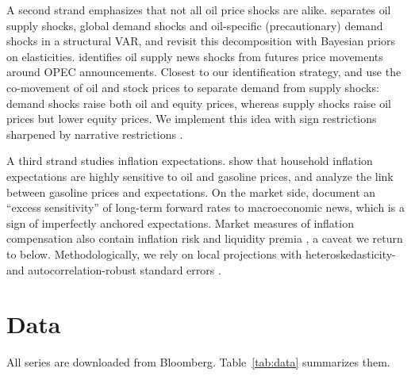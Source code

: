 \documentclass[11pt,a4paper]{article}
\begin{document}
A second strand emphasizes that not all oil price shocks are alike. \citet{kilian2009} separates oil supply shocks, global demand shocks and oil-specific (precautionary) demand shocks in a structural VAR, and \citet{baumeister2019} revisit this decomposition with Bayesian priors on elasticities. \citet{kanzig2021} identifies oil supply news shocks from futures price movements around OPEC announcements. Closest to our identification strategy, \citet{kilianpark2009} and \citet{ready2018} use the co-movement of oil and stock prices to separate demand from supply shocks: demand shocks raise both oil and equity prices, whereas supply shocks raise oil prices but lower equity prices. We implement this idea with sign restrictions \citep{uhlig2005} sharpened by narrative restrictions \citep{antolin2018}.

A third strand studies inflation expectations. \citet{coibion2015} show that household inflation expectations are highly sensitive to oil and gasoline prices, and \citet{kilianzhou2022} analyze the link between gasoline prices and expectations. On the market side, \citet{gurkaynak2005} document an ``excess sensitivity'' of long-term forward rates to macroeconomic news, which is a sign of imperfectly anchored expectations. Market measures of inflation compensation also contain inflation risk and liquidity premia \citep{damico2018}, a caveat we return to below. Methodologically, we rely on local projections \citep{jorda2005} with heteroskedasticity- and autocorrelation-robust standard errors \citep{newey1987}.

\section{Data}

All series are downloaded from Bloomberg. Table~\ref{tab:data} summarizes them.
\end{document}
